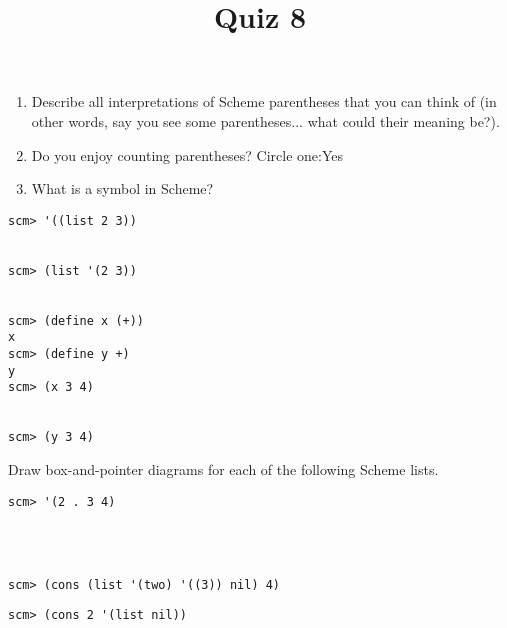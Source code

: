 \documentclass[twoside]{article}
\title{\sc Quiz 8}
\begin{document}
\thispagestyle{empty}
\maketitle

\begin{enumerate}

\begin{enumerate}
\item Describe all interpretations of Scheme parentheses that you can think of (in other words, say you see some parentheses... what could their meaning be?).

\vspace{0.5in}

\item Do you enjoy counting parentheses? Circle one:\:\:Yes

\vspace{0.02in}

\item What is a symbol in Scheme?

\vspace{0.5in}

\end{enumerate}


\begin{lstlisting}
scm> '((list 2 3))


scm> (list '(2 3))


scm> (define x (+))
x
scm> (define y +)
y
scm> (x 3 4)


scm> (y 3 4)
\end{lstlisting}

\vspace{0.3in}


Draw box-and-pointer diagrams for each of the following Scheme lists.

\begin{lstlisting}
scm> '(2 . 3 4)




scm> (cons (list '(two) '((3)) nil) 4)
\end{lstlisting}

\newpage

\begin{lstlisting}
scm> (cons 2 '(list nil))





\end{lstlisting}
\end{enumerate}
\end{document}
